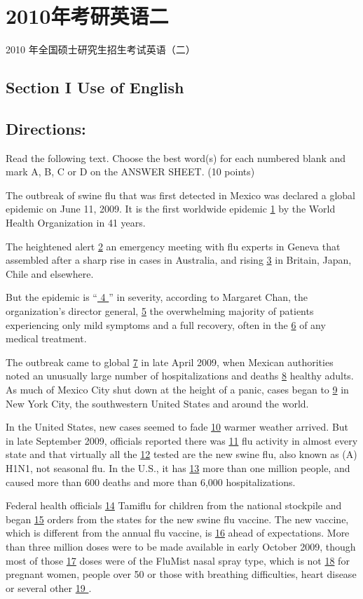 \documentclass[UTF8,11pt]{ctexart}
\begin{document}
\section*{2010年考研英语二}
2010 年全国硕士研究生招生考试英语（二）


\subsection*{\textbf{Section I Use of English}}


\subsection*{\textbf{Directions:}}


Read the following text. Choose the best word(s) for each numbered blank and mark A, B, C or D on the ANSWER SHEET. (10 points)


The outbreak of swine flu that was first detected in Mexico was declared a global epidemic on June 11, 2009. It is the first worldwide epidemic \uline{1} by the World Health Organization in 41 years.


The heightened alert \uline{2} an emergency meeting with flu experts in Geneva that assembled after a sharp rise in cases in Australia, and rising \uline{3} in Britain, Japan, Chile and elsewhere.


But the epidemic is “\uline{ 4 }” in severity, according to Margaret Chan, the organization’s director general, \uline{5} the overwhelming majority of patients experiencing only mild symptoms and a full recovery, often in the \uline{6} of any medical treatment.


The outbreak came to global \uline{7} in late April 2009, when Mexican authorities noted an unusually large number of hospitalizations and deaths \uline{8} healthy adults. As much of Mexico City shut down at the height of a panic, cases began to \uline{9} in New York City, the southwestern United States and around the world.


In the United States, new cases seemed to fade \uline{10} warmer weather arrived. But in late September 2009, officials reported there was \uline{11} flu activity in almost every state and that virtually all the \uline{12} tested are the new swine flu, also known as (A) H1N1, not seasonal flu. In the U.S., it has \uline{13} more than one million people, and caused more than 600 deaths and more than 6,000 hospitalizations.


Federal health officials \uline{14} Tamiflu for children from the national stockpile and began \uline{15} orders from the states for the new swine flu vaccine. The new vaccine, which is different from the annual flu vaccine, is \uline{16} ahead of expectations. More than three million doses were to be made available in early October 2009, though most of those \uline{17} doses were of the FluMist nasal spray type, which is not \uline{18} for pregnant women, people over 50 or those with breathing difficulties, heart disease or several other \uline{19 }.
\end{document}
